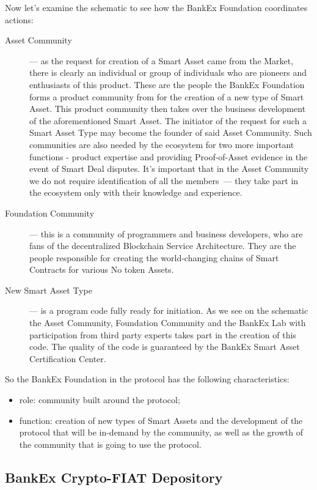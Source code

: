 \documentclass{article}
\begin{document}
\begin{multicols}{2}
Now let’s examine the schematic to see how the BankEx Foundation coordinates actions:

\begin{description}

\item[Asset Community]--- as the request for creation of a Smart Asset came from the Market, there is clearly an individual or group of individuals who are pioneers and enthusiasts of this product. These are the people the BankEx Foundation forms a product community from for the creation of a new type of Smart Asset. This product community then takes over the business development of the aforementioned Smart Asset. The initiator of the request for such a Smart Asset Type may become the founder of said Asset Community. Such communities are also needed by the ecosystem for two more important functions - product expertise and providing Proof-of-Asset evidence in the event of Smart Deal disputes. It’s important that in the Asset Community we do not require identification of all the members~--- they take part in the ecosystem only with their knowledge and experience. 
\item[Foundation Community]--- this is a community of programmers and business developers, who are fans of the decentralized Blockchain Service Architecture. They are the people responsible for creating the world-changing chains of Smart Contracts for various No token Assets.
\item[New Smart Asset Type]--- is a program code fully ready for initiation. As we see on the schematic the Asset Community, Foundation Community and the BankEx Lab with participation from third party experts takes part in the creation of this code. The quality of the code is guaranteed by the BankEx Smart Asset Certification Center.
\end{description}

So the BankEx Foundation in the protocol has the following characteristics:

\begin{itemize}
\item role: community built around the protocol;
\item function: creation of new types of Smart Assets and the development of the protocol that will be in-demand by the community, as well as the growth of the community that is going to use the protocol.
\end{itemize}

\subsection{BankEx Crypto-FIAT Depository}


\end{multicols}
\end{document}
